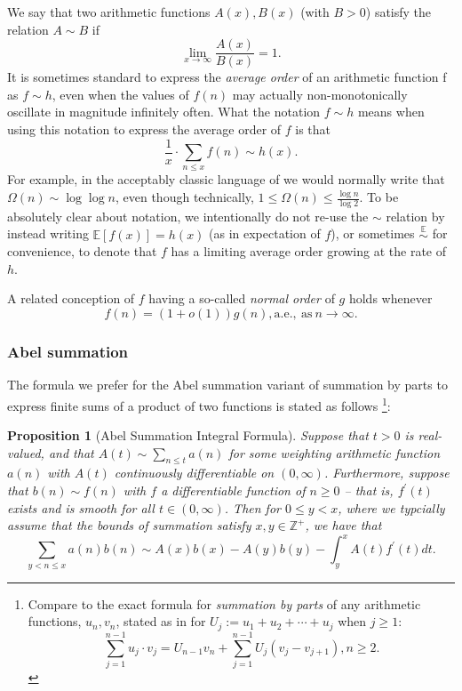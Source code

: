 \documentclass[11pt,reqno,a4letter]{article}
\numberwithin{figure}{section}
\numberwithin{table}{section}
\newcommand{\cf}{\textit{cf.\ }}
\theoremstyle{plain}
\newtheorem{prop}[theorem]{Proposition}
\numberwithin{theorem}{section}
\theoremstyle{definition}
\begin{document}
We say that two arithmetic functions $A(x), B(x)$ (with $B > 0$) satisfy the relation $A \sim B$ if 
\[
\lim_{x \rightarrow \infty} \frac{A(x)}{B(x)} = 1. 
\] 
It is sometimes standard to express the \emph{average order} of an arithmetic function f as 
$f \sim h$, even when the values of $f(n)$ may actually non-monotonically 
oscillate in magnitude infinitely often. What the notation $f \sim h$ means when using this 
notation to express the average order of $f$ is that 
$$\frac{1}{x} \cdot \sum_{n \leq x} f(n) \sim h(x).$$ 
For example, in the acceptably classic language of \cite{HARDYWRIGHT} we would normally write that 
$\Omega(n) \sim \log\log n$, even though technically, 
$1 \leq \Omega(n) \leq \frac{\log n}{\log 2}$. 
To be absolutely clear about notation, we intentionally do not re-use the $\sim$ relation by 
instead writing $\mathbb{E}[f(x)] = h(x)$ (as in expectation of $f$), or sometimes 
$\overset{\mathbb{E}}{\sim}$ for convenience,  
to denote that $f$ has a limiting average order growing at the 
rate of $h$. 

A related conception of $f$ having a so-called \emph{normal order} of $g$ holds whenever 
$$f(n) = (1+o(1)) g(n), \mathrm{a.e.}, \mathrm{\ as\ } n \rightarrow \infty.$$

\subsubsection{Abel summation} 

The formula we prefer for the Abel summation variant of summation by parts 
to express finite sums of a product of two functions is stated as follows 
\cite[\cf \S 4.3]{APOSTOLANUMT} \footnote{
     Compare to the exact formula for \emph{summation by parts} of any arithmetic functions, $u_n,v_n$, 
     stated as in \cite[\S 2.10(ii)]{NISTHB} for $U_j := u_1+u_2+\cdots+u_j$ when $j \geq 1$: 
     \[
     \sum_{j=1}^{n-1} u_j \cdot v_j = U_{n-1} v_n + \sum_{j=1}^{n-1} U_j \left(v_j - v_{j+1}\right), n \geq 2. 
     \]
}: 
 
\begin{prop}[Abel Summation Integral Formula] 
\label{prop_AbelSummationFormula} 
Suppose that $t > 0$ is real-valued, and that $A(t) \sim \sum_{n \leq t} a(n)$ for some weighting 
arithmetic function $a(n)$ with $A(t)$ continuously differentiable on $(0, \infty)$. Furthermore, suppose that 
$b(n) \sim f(n)$ with $f$ a differentiable function of $n \geq 0$ -- that is, $f^{\prime}(t)$ exists and is smooth for all 
$t \in (0, \infty)$. 
Then for $0 \leq y < x$, where we typcially assume that the bounds of summation satisfy 
$x, y \in \mathbb{Z}^{+}$, we have that 
\[
\sum_{y < n \leq x} a(n) b(n) \sim A(x)b(x) - A(y)b(y) - \int_y^{x} A(t) f^{\prime}(t) dt. 
\] 
\end{prop}
          
\end{document}
